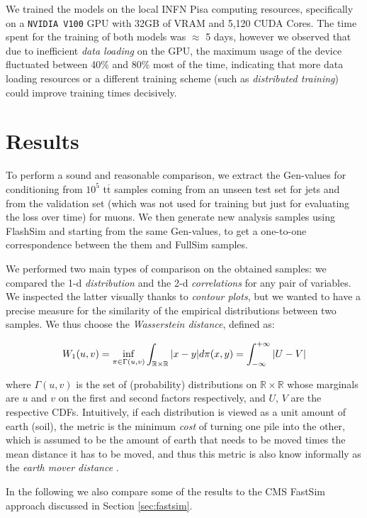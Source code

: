 We trained the models on the local INFN Pisa computing resources, specifically on a \texttt{NVIDIA V100} GPU with 32GB of VRAM and 5,120 CUDA Cores. The time spent for the training of both models was $\approx$ 5 days, however we observed that due to inefficient \emph{data loading} on the GPU, the maximum usage of the device fluctuated between 40$\%$ and 80$\%$ most of the time, indicating that more data loading resources or a different training scheme (such as \emph{distributed training}) could improve training times decisively.

\section{Results}

To perform a sound and reasonable comparison, we extract the Gen-values for conditioning from $10^{5}$ t$\overline{\text{t}}$ samples coming from an unseen test set for jets and from the validation set (which was not used for training but just for evaluating the loss over time) for muons. We then generate new analysis samples using FlashSim and starting from the same Gen-values, to get a one-to-one correspondence between the them and FullSim samples.

We performed two main types of comparison on the obtained samples: we compared the 1-d \emph{distribution} and the 2-d \emph{correlations} for any pair of variables.
We inspected the latter visually thanks to \emph{contour plots}, but we wanted to have a precise measure for the similarity of the empirical distributions between two samples. We thus choose the \emph{Wasserstein distance}, defined as:

\[W_1(u, v) = \inf_{\pi \in \Gamma(u, v)}\int_{\mathbb{R}\times\mathbb{R}}\abs{x-y}d\pi(x,y) = \int_{-\infty}^{+\infty} \abs{U - V}\]

where $\Gamma(u, v)$ is the set of (probability) distributions on $\mathbb{R}\times\mathbb{R}$ whose marginals are $u$ and $v$ on the first and second factors respectively, and $U$, $V$ are the respective CDFs. Intuitively, if each distribution is viewed as a unit amount of earth (soil), the metric is the minimum \emph{cost} of turning one pile into the other, which is assumed to be the amount of earth that needs to be moved times the mean distance it has to be moved, and thus this metric is also know informally as the \emph{earth mover distance} \cite{https://doi.org/10.48550/arxiv.1509.02237}. 

In the following we also compare some of the results to the CMS FastSim approach discussed in Section \ref{sec:fastsim}.

